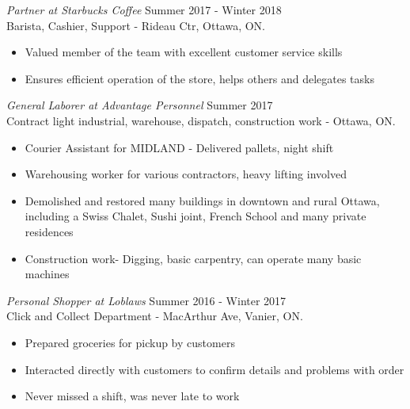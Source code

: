 \documentclass[margin]{res}
\begin{document}
\begin{resume}
                {\sl Partner at Starbucks Coffee} \hfill Summer 2017 - Winter 2018 \\
                Barista, Cashier, Support - Rideau Ctr, Ottawa, ON.
                 \begin{itemize}  \itemsep -2pt %
                 \item Valued member of the team with excellent customer service skills
                \item  Ensures efficient operation of the store, helps others and delegates tasks
                \end{itemize}
 
 {\sl General Laborer at Advantage Personnel} \hfill    Summer 2017 \\
                Contract light industrial, warehouse, dispatch, construction work - Ottawa, ON.
                 \begin{itemize}  \itemsep -2pt %
                 \item Courier Assistant for MIDLAND - Delivered pallets, night shift
                 \item Warehousing worker for various contractors, heavy lifting involved
                 \item Demolished and restored many buildings in downtown and rural Ottawa, including a Swiss Chalet, Sushi joint, French School and many private residences
\item Construction work- Digging, basic carpentry, can operate many basic machines
                 \end{itemize} 
 
 
                {\sl Personal Shopper at Loblaws} \hfill            Summer 2016 - Winter 2017 \\
                Click and Collect Department - MacArthur Ave, Vanier, ON.
                 \begin{itemize}  \itemsep -2pt %
                 \item Prepared groceries for pickup by customers
                 \item Interacted directly with customers to confirm details and problems with order
                 \item Never missed a shift, was never late to work
                 \end{itemize} 



\end{resume}
\end{document}
